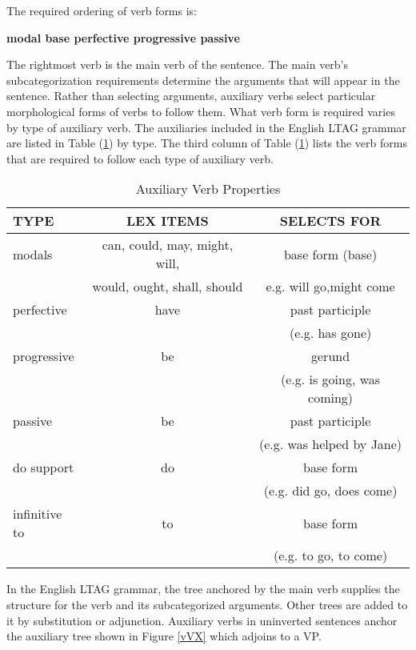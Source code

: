 
The required ordering of verb forms is:

\begin{description}
\item {\bf modal base perfective progressive passive}
\end{description}

The rightmost verb is the main verb of the sentence.  The main verb's
subcategorization requirements determine the arguments that will appear in the
sentence.  Rather than selecting arguments, auxiliary verbs select particular
morphological forms of verbs to follow them.  What  verb form is required
varies by type of auxiliary verb.  The auxiliaries included in the English
LTAG grammar are listed in Table (\ref{aux-table}) by type.  The third column
of Table (\ref{aux-table}) lists the verb forms that are required to follow
each type of auxiliary verb.       

\vspace{2cm}

\begin{table}[ht]
\begin{tabular}{|l|c|c|}  
\hline
TYPE&LEX ITEMS&SELECTS FOR\\     
\hline
modals & can, could, may, might, will, & base form (base)\\
& would, ought, shall, should & e.g. will go,might come\\   
\hline
perfective & have & past participle\\
& & (e.g. has gone)\\  
\hline
progressive & be & gerund\\
& & (e.g. is going, was coming)\\  
\hline
passive & be & past participle\\
& & (e.g. was helped by Jane)\\  
\hline
do support & do &base form\\
& & (e.g. did go, does come)\\  
\hline
infinitive to & to & base form\\
& & (e.g. to go, to come)\\  
\hline
\end{tabular}
\caption{Auxiliary Verb Properties}
\label{aux-table}
\end{table}
\vspace{2cm}

In the English LTAG grammar, the tree anchored by the main verb
supplies the structure for the verb and its subcategorized arguments.
Other trees are added to it by substitution or adjunction.  Auxiliary
verbs in uninverted sentences anchor the auxiliary tree shown in
Figure \ref{vVX} which adjoins to a VP.

